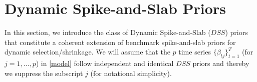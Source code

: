 \documentclass[ba]{imsart}
\numberwithin{equation}{section}
\theoremstyle{plain}
\begin{document}
\section{Dynamic Spike-and-Slab  Priors}\label{sec:assp}
In this section, we introduce the class of Dynamic Spike-and-Slab ($DSS$) priors that constitute a coherent extension of benchmark spike-and-slab priors  for dynamic selection/shrinkage.
We will assume that the $p$ time series $\{\beta_{tj}\}_{t=1}^T$ (for $j=1,\dots, p$) in \eqref{model} follow independent and identical $DSS$ priors and thereby we suppress the subscript $j$ (for notational simplicity).
\end{document}
